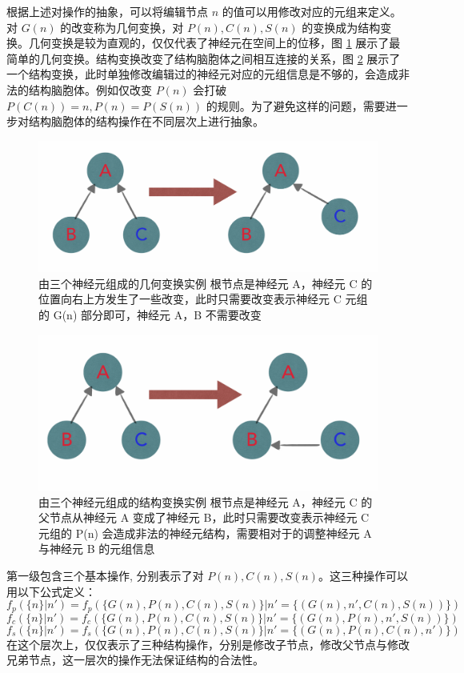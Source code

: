 根据上述对操作的抽象，可以将编辑节点 $n$ 的值可以用修改对应的元组来定义。对 $G(n)$ 的改变称为几何变换，对 $P(n), C(n), S(n)$ 的变换成为结构变换。几何变换是较为直观的，仅仅代表了神经元在空间上的位移，图 \ref{gem} 展示了最简单的几何变换。结构变换改变了结构脑胞体之间相互连接的关系，图 \ref{stru} 展示了一个结构变换，此时单独修改编辑过的神经元对应的元组信息是不够的，会造成非法的结构脑胞体。例如仅改变 $P(n)$ 会打破 $P(C(n)) = n, P(n) = P(S(n))$ 的规则。为了避免这样的问题，需要进一步对结构脑胞体的结构操作在不同层次上进行抽象。

\begin{figure}
\centering
\includegraphics[width=148mm]{images/gem}
\caption{由三个神经元组成的几何变换实例 根节点是神经元 A，神经元 C 的位置向右上方发生了一些改变，此时只需要改变表示神经元 C 元组的 G(n) 部分即可，神经元 A，B 不需要改变}
\label{gem}
\end{figure}

\begin{figure}
\centering
\includegraphics[width=148mm]{images/stru}
\caption{由三个神经元组成的结构变换实例 根节点是神经元 A，神经元 C 的
父节点从神经元 A 变成了神经元 B，此时只需要改变表示神经元 C 元组的 P(n) 会造成非法的神经元结构，需要相对于的调整神经元 A 与神经元 B 的元组信息}
\label{stru}
\end{figure}

第一级包含三个基本操作, 分别表示了对 $P(n), C(n), S(n)$。这三种操作可以用以下公式定义：
$$f_p(\{n\}|n') = f_p(\{G(n), P(n), C(n), S(n)\}|n' = \{(G(n), n', C(n), S(n))\})$$
$$f_c(\{n\}|n') = f_c(\{G(n), P(n), C(n), S(n)\}|n' = \{(G(n), P(n), n', S(n))\})$$
$$f_s(\{n\}|n') = f_s(\{G(n), P(n), C(n), S(n)\}|n' = \{(G(n), P(n), C(n), n')\})$$
在这个层次上，仅仅表示了三种结构操作，分别是修改子节点，修改父节点与修改兄弟节点，这一层次的操作无法保证结构的合法性。

